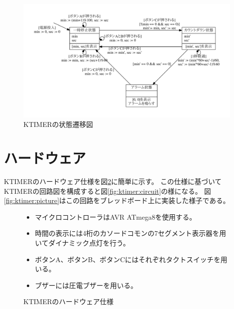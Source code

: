 \begin{figure}[h]
 \begin{center}
  \includegraphics[width=155mm]{figure/ktimer_state.pdf}
 \end{center}
 \caption{KTIMERの状態遷移図}
 \label{fig:ktimer:state}
\end{figure}

\clearpage
\section{ハードウェア}
KTIMERのハードウェア仕様を図\ref{fig:ktimer:hardware}に簡単に示す。
この仕様に基づいてKTIMERの回路図を構成すると図\ref{fig:ktimer:circuit}の様になる。
図\ref{fig:ktimer:picture}はこの回路をブレッドボード上に実装した様子である。


\begin{figure}[h]
\begin{screen}
\begin{itemize}
  \item マイクロコントローラはAVR ATmega8を使用する。
  \item 時間の表示には4桁のカソードコモンの7セグメント表示器を用いてダイナミック点灯を行う。
  \item ボタンA、ボタンB、ボタンCにはそれぞれタクトスイッチを用いる。
  \item ブザーには圧電ブザーを用いる。
\end{itemize}
\end{screen}
\caption{KTIMERのハードウェア仕様}
\label{fig:ktimer:hardware}
\end{figure}

